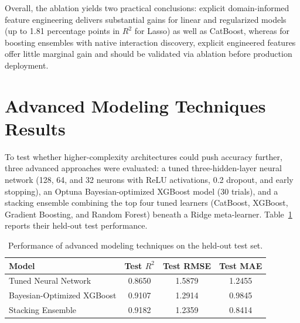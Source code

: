 Overall, the ablation yields two practical conclusions: explicit domain-informed feature engineering delivers substantial gains for linear and regularized models (up to 1.81 percentage points in \(R^2\) for Lasso) as well as CatBoost, whereas for boosting ensembles with native interaction discovery, explicit engineered features offer little marginal gain and should be validated via ablation before production deployment.


\section{Advanced Modeling Techniques Results}

To test whether higher-complexity architectures could push accuracy further, three advanced approaches were evaluated: a tuned three-hidden-layer neural network (128, 64, and 32 neurons with ReLU activations, 0.2 dropout, and early stopping), an Optuna Bayesian-optimized XGBoost model (30 trials), and a stacking ensemble combining the top four tuned learners (CatBoost, XGBoost, Gradient Boosting, and Random Forest) beneath a Ridge meta-learner. Table~\ref{tab:advanced_performance}\cite{atique2026explainable} reports their held-out test performance.

\begin{table}[H]
\centering
\setlength{\arrayrulewidth}{1.8pt}
\renewcommand{\arraystretch}{1.2}

\begin{tabular}{|l|c|c|c|}
\hline
\textbf{Model} & \textbf{Test \(R^2\)} & \textbf{Test RMSE} & \textbf{Test MAE} \\
\hline
Tuned Neural Network       & 0.8650 & 1.5879 & 1.2455 \\
\hline
Bayesian-Optimized XGBoost & 0.9107 & 1.2914 & 0.9845 \\
\hline
Stacking Ensemble          & 0.9182 & 1.2359 & 0.8414 \\
\hline
\end{tabular}
\caption{Performance of advanced modeling techniques on the held-out test set.}
\label{tab:advanced_performance}
\end{table}

